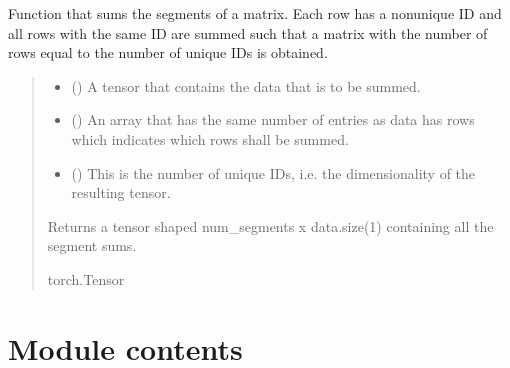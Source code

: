 \documentclass[a4paper,10pt,english]{report}
\begin{document}
\begin{fulllineitems}
\label{\detokenize{NNucleate:NNucleate.utils.unsorted_segment_sum}}
\pysigstartsignatures
{}
\pysigstopsignatures
\sphinxAtStartPar
Function that sums the segments of a matrix. Each row has a non\sphinxhyphen{}unique ID and all rows with the same ID are summed such that a matrix with the number of rows equal to the number of unique IDs is obtained.
\begin{quote}\begin{description}
\begin{itemize}
\item {} 
\sphinxAtStartPar
{} () \textendash{} A tensor that contains the data that is to be summed.

\item {} 
\sphinxAtStartPar
{} () \textendash{} An array that has the same number of entries as data has rows which indicates which rows shall be summed.

\item {} 
\sphinxAtStartPar
{} () \textendash{} This is the number of unique IDs, i.e. the dimensionality of the resulting tensor.

\end{itemize}

\sphinxAtStartPar
Returns a tensor shaped num\_segments x data.size(1) containing all the segment sums.

\sphinxAtStartPar
torch.Tensor

\end{description}\end{quote}

\end{fulllineitems}



\chapter{Module contents}
\label{\detokenize{NNucleate:module-NNucleate}}\label{\detokenize{NNucleate:module-contents}}
\end{document}
